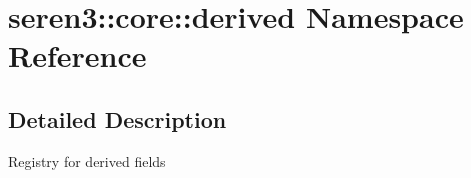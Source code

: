 \hypertarget{namespaceseren3_1_1core_1_1derived}{
\section{seren3::core::derived Namespace Reference}
\label{namespaceseren3_1_1core_1_1derived}
}


\subsection{Detailed Description}
\begin{DoxyVerb}
Registry for derived fields
\end{DoxyVerb}
 